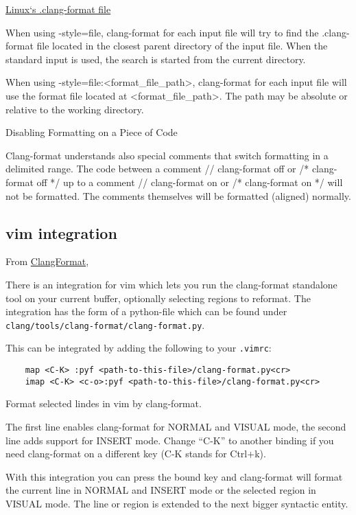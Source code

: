 \href{https://github.com/torvalds/linux/blob/master/.clang-format}{Linux`s .clang-format file} 

When using -style=file, clang-format for each input file will try to find the .clang-format file located in the closest parent directory of the input file. When the standard input is used, the search is started from the current directory.

When using -style=file:<format\_file\_path>, clang-format for each input file will use the format file located at <format\_file\_path>. The path may be absolute or relative to the working directory.



Disabling Formatting on a Piece of Code

Clang-format understands also special comments that switch formatting in a delimited range. The code between a comment // clang-format off or /* clang-format off */ up to a comment // clang-format on or /* clang-format on */ will not be formatted. The comments themselves will be formatted (aligned) normally.


\subsection{vim integration}
From \href{https://clang.llvm.org/docs/ClangFormat.html}{ClangFormat},

There is an integration for vim which lets you run the clang-format standalone tool on your current buffer, optionally selecting regions to reformat. The integration has the form of a python-file which can be found under \texttt{clang/tools/clang-format/clang-format.py}.

This can be integrated by adding the following to your \texttt{.vimrc}:

\begin{listing}[!ht]
  \begin{verbatim}
    map <C-K> :pyf <path-to-this-file>/clang-format.py<cr>
    imap <C-K> <c-o>:pyf <path-to-this-file>/clang-format.py<cr>
  \end{verbatim}
  \caption{Format selected lindes in vim by clang-format.}
  \label{vim.clang.format}
\end{listing}


The first line enables clang-format for NORMAL and VISUAL mode, the second line adds support for INSERT mode. Change “C-K” to another binding if you need clang-format on a different key (C-K stands for Ctrl+k).

With this integration you can press the bound key and clang-format will format the current line in NORMAL and INSERT mode or the selected region in VISUAL mode. The line or region is extended to the next bigger syntactic entity.

